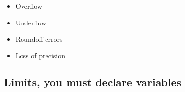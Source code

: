 \documentclass[%
twoside,                 %
final,                   %
10pt]{article}
\newenvironment{block_mdfboxadmon}[1][]{
\begin{block_mdfboxmdframed}[frametitle=#1]
}
{
\end{block_mdfboxmdframed}
}
\begin{document}
\begin{block_mdfboxadmon}

\begin{itemize}
  \item Overflow

  \item Underflow

  \item Roundoff errors

  \item Loss of precision
\end{itemize}

\noindent
\end{block_mdfboxadmon}



\subsection{Limits, you must declare variables}
\end{document}
